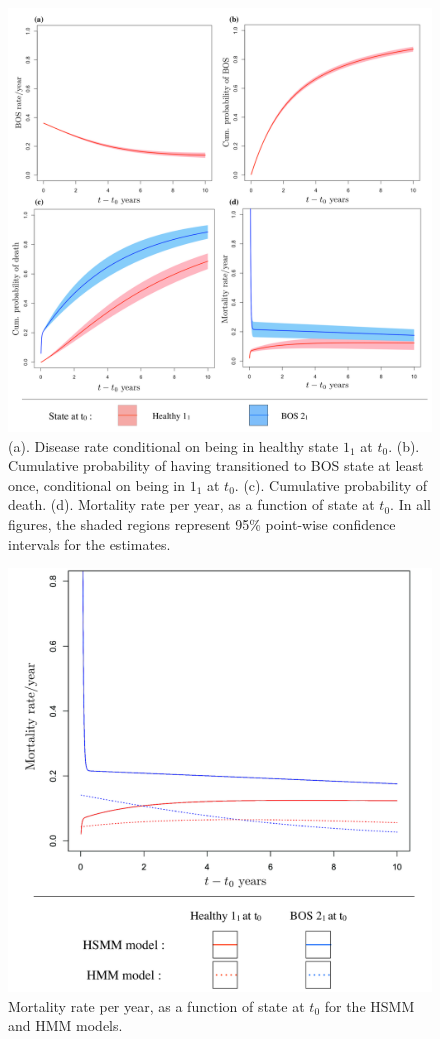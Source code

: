 \documentclass{uwstat572}
\begin{document}
\begin{figure}[]
\centering
\includegraphics[scale=0.45]{4plots4.pdf}
\caption{(a). Disease rate conditional on being in healthy state $1_1$ at $t_0$. (b). Cumulative probability of having transitioned to BOS state at least once, conditional on being in $1_1$ at $t_0$. (c). Cumulative probability of death. (d). Mortality rate per year, as a function of state at $t_0$. In all figures, the shaded regions represent 95\% point-wise confidence intervals for the estimates.
}
\end{figure}


\begin{figure}
\centering
\includegraphics[scale=0.25]{mortcomp_hsmmhmm.pdf}
\caption{Mortality rate per year, as a function of state at $t_0$ for the HSMM and HMM models.}
\end{figure}
\end{document}
